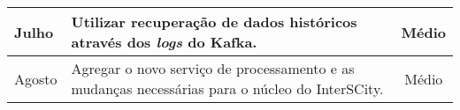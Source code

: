 \begin{table}[h]
\begin{center}
\begin{tabular}{|l| p{12cm}|c|}
        \hline Julho & Utilizar recuperação de dados históricos através dos
        \textit{logs} do Kafka. & Médio \\

        \hline Agosto & Agregar o novo serviço de processamento e as mudanças
        necessárias para o núcleo do InterSCity. & Médio \\

      \hline
    \end{tabular}
  \end{center}
  \label{tab:cronograma}
\end{table}
